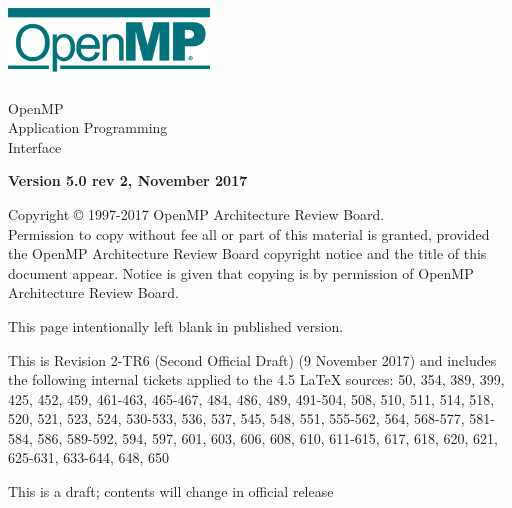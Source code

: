 
  \begin{titlepage}
    \begin{flushleft}
     \hspace{-6em} \includegraphics[width=0.4\textwidth]{openmp-logo.png}
    \end{flushleft}

    \begin{adjustwidth}{-0.75in}{0in}
    \begin{center}
      \Huge
      \textsf{OpenMP\\Application Programming\\Interface}

      \vspace{0.5in}\textsf{    }\vspace{-0.7in}
      \normalsize

      \vspace{1.0in}

      \textbf{Version 5.0 rev 2, November 2017}
    \end{center}
    \end{adjustwidth}

    \vspace{3.0in}

\begin{adjustwidth}{0pt}{1em}\setlength{\parskip}{0.25\baselineskip}%
Copyright © 1997-2017 OpenMP Architecture Review Board.\\
Permission to copy without fee all or part of this material is granted,
provided the OpenMP Architecture Review Board copyright notice and
the title of this document appear. Notice is given that copying is by
permission of OpenMP Architecture Review Board.\end{adjustwidth}

  \end{titlepage}


\clearpage
\thispagestyle{empty}
\phantom{a}
This page intentionally left blank in published version.

This is Revision 2-TR6 (Second Official Draft) (9 November 2017) and 
includes the following internal tickets applied to the 4.5 LaTeX sources: 
50, 354, 389, 399, 425, 452, 459, 461-463, 465-467, 484, 486, 489, 491-504, 
508, 510, 511, 514, 518, 520, 521, 523, 524, 530-533, 536, 537, 545, 548, 
551, 555-562, 564, 568-577, 581-584, 586, 589-592, 594, 597, 601, 603, 606, 
608, 610, 611-615, 617, 618, 620, 621, 625-631, 633-644, 648, 650

This is a draft; contents will change in official release

\vfill


